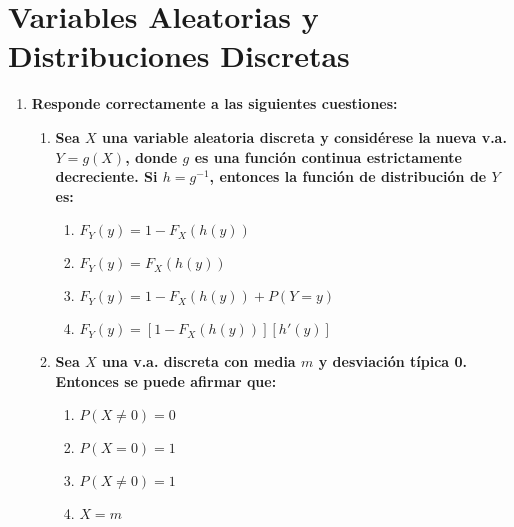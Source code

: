 \documentclass[fleqn]{article}
\begin{document}
        \newpage

        \section{Variables Aleatorias y Distribuciones Discretas}

        \begin{enumerate}

                \subsection{Opción Múltiple}
                \item \textbf{Responde correctamente a las siguientes cuestiones:}
                
                        \begin{enumerate}
                                \item \textbf{Sea $X$ una variable aleatoria discreta y considérese la nueva v.a. $Y = g(X)$, 
                                        donde $g$ es una función continua estrictamente decreciente. Si $h = g^{-1}$, entonces 
                                        la función de distribución de $Y$ es:} 
                                        \begin{enumerate}
                                                \item $F_Y (y) = 1 - F_X (h(y))$
                                                \item $F_Y (y) = F_X (h(y))$
                                                \item $F_Y (y) = 1 - F_X (h(y)) + P(Y=y)$
                                                \item $F_Y (y) = [1 - F_X (h(y))][h'(y)]$
                                        \end{enumerate}
                                \item \textbf{Sea $X$ una v.a. discreta con media $m$ y desviación típica 0. Entonces se puede afirmar que:}
                                        \begin{enumerate}
                                                \item $P(X \neq 0) = 0$
                                                \item $P(X = 0) = 1$
                                                \item $P(X \neq 0) = 1$
                                                \item $X=m$

\end{enumerate}
\end{enumerate}
\end{enumerate}
\end{document}

